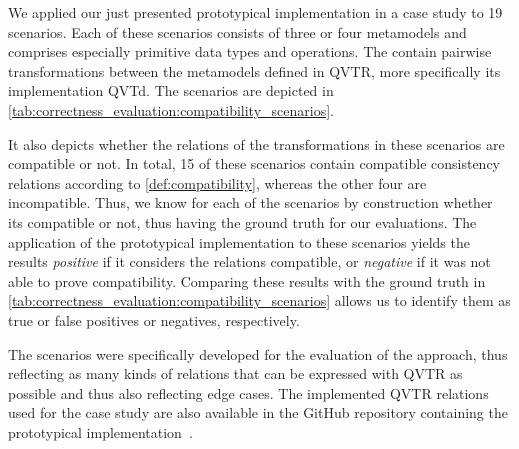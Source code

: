 We applied our just presented prototypical implementation in a case study to 19 scenarios.
Each of these scenarios consists of three or four metamodels and comprises especially primitive data types and operations.
The contain pairwise transformations between the metamodels defined in \gls{QVTR}, more specifically its implementation \gls{QVTd}.
The scenarios are depicted in \autoref{tab:correctness_evaluation:compatibility_scenarios}.

It also depicts whether the relations of the transformations in these scenarios are compatible or not.
In total, 15 of these scenarios contain compatible consistency relations according to \autoref{def:compatibility}, whereas the other four are incompatible.
Thus, we know for each of the scenarios by construction whether its compatible or not, thus having the ground truth for our evaluations.
The application of the prototypical implementation to these scenarios yields the results \emph{positive} if it considers the relations compatible, or \emph{negative} if it was not able to prove compatibility.
Comparing these results with the ground truth in \autoref{tab:correctness_evaluation:compatibility_scenarios} allows us to identify them as true or false positives or negatives, respectively.

The scenarios were specifically developed for the evaluation of the approach, thus reflecting as many kinds of relations that can be expressed with \gls{QVTR} as possible and thus also reflecting edge cases.
The implemented \gls{QVTR} relations used for the case study are also available in the GitHub repository containing the prototypical implementation~\cite{decompositionGithub}.




